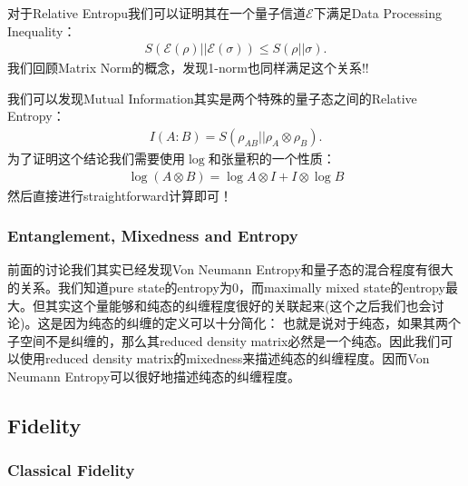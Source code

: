   \bigskip

  对于Relative Entropu我们可以证明其在一个量子信道$ \mathcal{E} $下满足Data Processing Inequality：
  \begin{align}
    S(\mathcal{E}(\rho) || \mathcal{E}(\sigma)) \leq S(\rho || \sigma).
  \end{align}
  我们回顾Matrix Norm的概念，发现1-norm也同样满足这个关系!!

  \bigskip

  我们可以发现Mutual Information其实是两个特殊的量子态之间的Relative Entropy：
  \begin{align}
    I(A:B) = S(\rho_{AB} || \rho_A \otimes \rho_B).
  \end{align}
  为了证明这个结论我们需要使用$ \log $和张量积的一个性质：
  \begin{align}
    \log(A\otimes B)=\log A\otimes I+I\otimes\log B
  \end{align}
  然后直接进行straightforward计算即可！

  \subsubsection{Entanglement, Mixedness and Entropy}
  前面的讨论我们其实已经发现Von Neumann Entropy和量子态的混合程度有很大的关系。我们知道pure
  state的entropy为0，而maximally mixed
  state的entropy最大。但其实这个量能够和纯态的纠缠程度很好的关联起来(这个之后我们也会讨论)。这是因为纯态的纠缠的定义可以十分简化：
  也就是说对于纯态，如果其两个子空间不是纠缠的，那么其reduced density
  matrix必然是一个纯态。因此我们可以使用reduced density
  matrix的mixedness来描述纯态的纠缠程度。因而Von Neumann Entropy可以很好地描述纯态的纠缠程度。

  \subsection{Fidelity}
  \subsubsection{Classical Fidelity}


